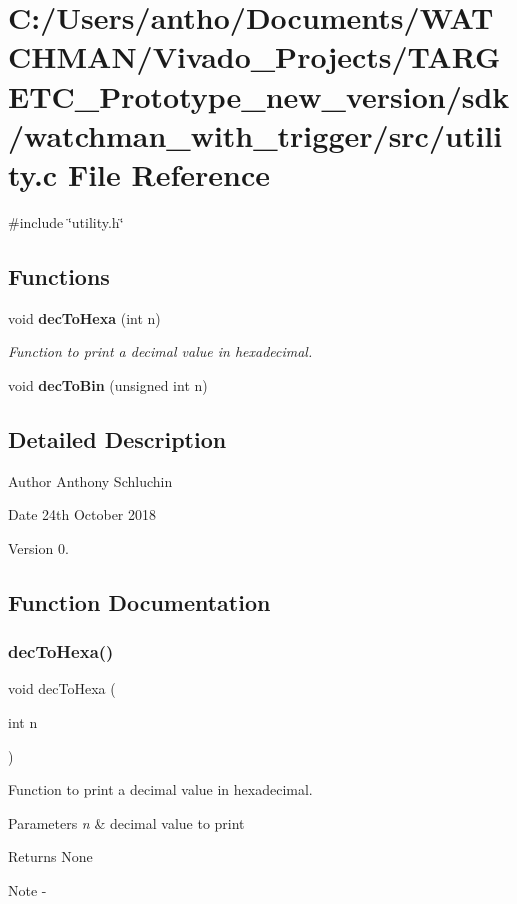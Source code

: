 \section{C\+:/\+Users/antho/\+Documents/\+W\+A\+T\+C\+H\+M\+A\+N/\+Vivado\+\_\+\+Projects/\+T\+A\+R\+G\+E\+T\+C\+\_\+\+Prototype\+\_\+new\+\_\+version/sdk/watchman\+\_\+with\+\_\+trigger/src/utility.c File Reference}
\label{utility_8c}
{\ttfamily \#include \char`\"{}utility.\+h\char`\"{}}\newline
\subsection*{Functions}
\begin{DoxyCompactItemize}
\item 
void \textbf{ dec\+To\+Hexa} (int n)
\begin{DoxyCompactList}\small\item\em Function to print a decimal value in hexadecimal. \end{DoxyCompactList}\item 
\mbox{\label{utility_8c_ab6bfd5f2ec61e61cf18720fc4996a2a5}} 
void {\bfseries dec\+To\+Bin} (unsigned int n)
\end{DoxyCompactItemize}


\subsection{Detailed Description}
\begin{DoxyAuthor}{Author}
Anthony Schluchin 
\end{DoxyAuthor}
\begin{DoxyDate}{Date}
24th October 2018 
\end{DoxyDate}
\begin{DoxyVersion}{Version}
0. 
\end{DoxyVersion}


\subsection{Function Documentation}
\mbox{\label{utility_8c_a5fb2cb4fed790bdbf631c7b081320eae}} 
\subsubsection{decToHexa()}
{\footnotesize\ttfamily void dec\+To\+Hexa (\begin{DoxyParamCaption}\item[{int}]{n }\end{DoxyParamCaption})}



Function to print a decimal value in hexadecimal. 


\begin{DoxyParams}{Parameters}
{\em n} & decimal value to print\\
\hline
\end{DoxyParams}
\begin{DoxyReturn}{Returns}
None
\end{DoxyReturn}
\begin{DoxyNote}{Note}
-\/ 
\end{DoxyNote}
